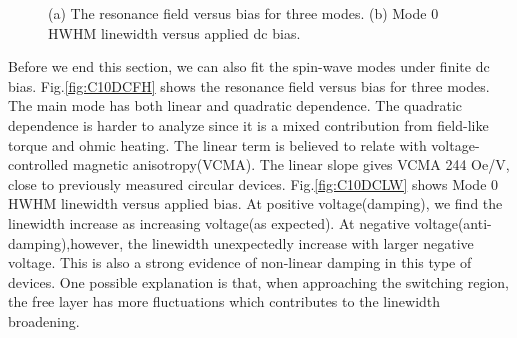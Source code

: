 \begin{figure}[!ht]
\centering
{}
\caption{(a) The resonance field versus bias for three modes. (b) Mode 0 HWHM linewidth versus applied dc bias.}
\end{figure}

Before we end this section, we can also fit the spin-wave modes under finite dc bias. Fig.\ref{fig:C10DCFH} shows the resonance field versus bias for three modes. The main mode has both linear and quadratic dependence. The quadratic dependence is harder to analyze since it is a mixed contribution from field-like torque and ohmic heating. The linear term is believed to relate with voltage-controlled magnetic anisotropy(VCMA). The linear slope gives VCMA 244 Oe/V, close to previously measured circular devices. Fig.\ref{fig:C10DCLW} shows Mode 0 HWHM linewidth versus applied bias. At positive voltage(damping), we find the linewidth increase as increasing voltage(as expected). At negative voltage(anti-damping),however, the linewidth unexpectedly increase with larger negative voltage. This is also a strong evidence of non-linear damping in this type of devices. One possible explanation is that, when approaching the switching region, the free layer has more fluctuations which contributes to the linewidth broadening.







